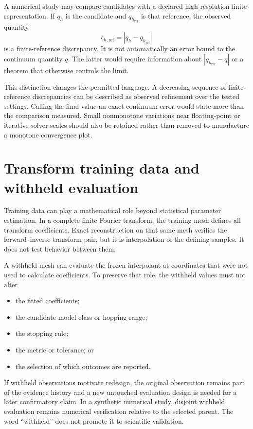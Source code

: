 A numerical study may compare candidates with a declared high-resolution
finite representation. If $q_h$ is the candidate and $q_{h_{\mathrm{ref}}}$ is
that reference, the observed quantity
\begin{equation}
  \epsilon_{h,\mathrm{ref}}
  =\left|q_h-q_{h_{\mathrm{ref}}}\right|
\end{equation}
is a finite-reference discrepancy. It is not automatically an error bound to
the continuum quantity $q$. The latter would require information about
$|q_{h_{\mathrm{ref}}}-q|$ or a theorem that otherwise controls the limit.

This distinction changes the permitted language. A decreasing sequence of
finite-reference discrepancies can be described as observed refinement over
the tested settings. Calling the final value an exact continuum error would
state more than the comparison measured. Small nonmonotone variations near
floating-point or iterative-solver scales should also be retained rather than
removed to manufacture a monotone convergence plot.

\section{Transform training data and withheld evaluation}

Training data can play a mathematical role beyond statistical parameter
estimation. In a complete finite Fourier transform, the training mesh defines
all transform coefficients. Exact reconstruction on that same mesh verifies
the forward--inverse transform pair, but it is interpolation of the defining
samples. It does not test behavior between them.

A withheld mesh can evaluate the frozen interpolant at coordinates that were
not used to calculate coefficients. To preserve that role, the withheld values
must not alter
\begin{itemize}
  \item the fitted coefficients;
  \item the candidate model class or hopping range;
  \item the stopping rule;
  \item the metric or tolerance; or
  \item the selection of which outcomes are reported.
\end{itemize}
If withheld observations motivate redesign, the original observation remains
part of the evidence history and a new untouched evaluation design is needed
for a later confirmatory claim. In a synthetic numerical study, disjoint
withheld evaluation remains numerical verification relative to the selected
parent. The word ``withheld'' does not promote it to scientific validation.

